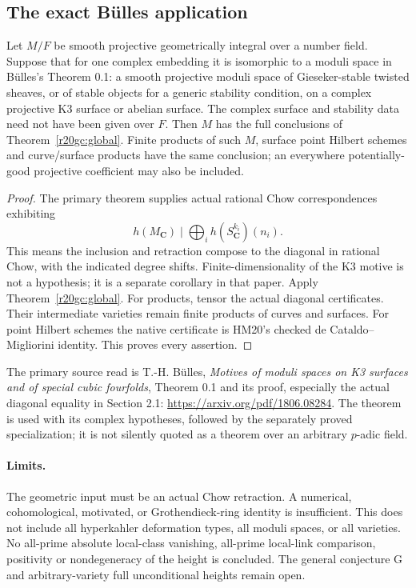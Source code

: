 \subsection{The exact B\"ulles application}

\begin{corollary}
\label{r20gc:moduli}
Let $M/F$ be smooth projective geometrically integral over a
number field.  Suppose that for one complex embedding it is
isomorphic to a moduli space in B\"ulles's Theorem 0.1:
a smooth projective moduli space of Gieseker-stable twisted
sheaves, or of stable objects for a generic stability condition,
on a complex projective K3 surface or abelian surface.
The complex surface and stability data need not have been
given over $F$.  Then $M$ has the full conclusions of
Theorem~\ref{r20gc:global}.  Finite products of such $M$,
surface point Hilbert schemes and curve/surface products
have the same conclusion; an everywhere potentially-good
projective coefficient may also be included.
\end{corollary}

\begin{proof}
The primary theorem supplies actual rational Chow
correspondences exhibiting
\[
 h(M_{\mathbf C})\mid
       \bigoplus_i h(S_{\mathbf C}^{k_i})(n_i).
 \tag{GC20.4}\label{r20gc:bulles}
\]
This means the inclusion and retraction compose to the
diagonal in rational Chow, with the indicated degree
shifts.  Finite-dimensionality of the K3 motive is not
a hypothesis; it is a separate corollary in that paper.
Apply Theorem~\ref{r20gc:global}.  For products, tensor the
actual diagonal certificates.  Their intermediate varieties
remain finite products of curves and surfaces.  For point
Hilbert schemes the native certificate is HM20's checked
de Cataldo--Migliorini identity.  This proves every assertion.
\end{proof}

The primary source read is T.-H. B\"ulles,
\emph{Motives of moduli spaces on K3 surfaces and of special
cubic fourfolds}, Theorem 0.1 and its proof, especially the
actual diagonal equality in Section 2.1:
\url{https://arxiv.org/pdf/1806.08284}.
The theorem is used with its complex hypotheses, followed
by the separately proved specialization; it is not silently
quoted as a theorem over an arbitrary $p$-adic field.

\paragraph{Limits.}
The geometric input must be an actual Chow retraction.
A numerical, cohomological, motivated, or Grothendieck-ring
identity is insufficient.  This does not include all
hyperkahler deformation types, all moduli spaces, or all
varieties.  No all-prime absolute local-class vanishing,
all-prime local-link comparison, positivity or nondegeneracy
of the height is concluded.  The general conjecture G and
arbitrary-variety full unconditional heights remain open.
